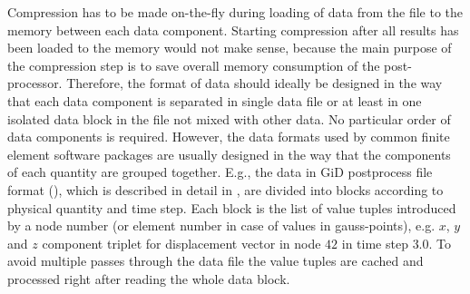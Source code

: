 Compression has to be made on-the-fly during loading of data from the file to the memory between each data component. Starting compression after all results has been loaded to the memory would not make sense, because the main purpose of the compression step is to save overall memory consumption of the post-processor. Therefore, the format of data should ideally be designed in the way that each data component is separated in single data file or at least in one isolated data block in the file not mixed with other data. No particular order of data components is required. However, the data formats used by common finite element software packages are usually designed in the way that the components of each quantity are grouped together. E.g., the data in GiD postprocess file format (), which is described in detail in \cite{GiDPostProcess}, are divided into blocks according to physical quantity and time step. Each block is the list of value tuples introduced by a node number (or element number in case of values in gauss-points), e.g. $x$, $y$ and $z$ component triplet for displacement vector in node $42$ in time step $3.0$. To avoid multiple passes through the data file the value tuples are cached and processed right after reading the whole data block.

